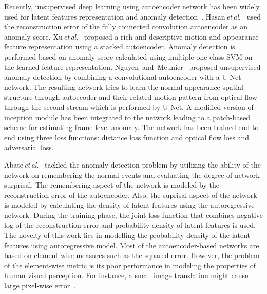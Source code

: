 \documentclass[journal]{IEEEtran}
\newcommand{\authorcite}{{\textit{et}\,\textit{al}.}}
\begin{document}
Recently, unsupervised deep learning using autoencoder network has been widely used for latent features representation and anomaly detection~\cite{xu2015learning,hasan2016learning,Abati_2019_CVPR,nguyen2019anomaly}. Hasan\,\authorcite~\cite{hasan2016learning} used the reconstruction error of the fully connected convolution autoencoder as an anomaly score. Xu\,\authorcite~\cite{xu2015learning} proposed a rich and descriptive motion and appearance feature representation using a stacked autoencoder. Anomaly detection is performed based on anomaly score calculated using multiple one class SVM on the learned feature representation. Nguyen~and~Meunier~\cite{nguyen2019anomaly} proposed unsupervised anomaly detection  by combining a convolutional autoencoder with a U-Net network. The resulting network tries to learn the normal appearance spatial structure through autoecoder and their related motion pattern from optical flow through the second stream which is performed by U-Net. A modified version of inception module has been integrated to the network leading to a patch-based scheme for estimating frame level anomaly. The network has been trained end-to-end using three loss functions: distance loss function and optical flow loss and adversarial loss.

Abate\,\authorcite~\cite{Abati_2019_CVPR} tackled the anomaly detection problem by utilizing the ability of the network on remembering the normal events and evaluating the degree of network surprisal. The remembering aspect of the network is modeled by the reconstruction error of the autoencoder. Also, the suprisal
aspect of the network is modeled by calculating the density of latent features using the autoregressive
network. During the training phase, the joint loss function that combines negative log of the reconstruction error and probability density of latent features is used. The novelty of this work lies in modelling 
the probability density of the latent features using autoregressive model. Most of the autoencoder-based networks are based on element-wise measures such as the squared error. However, the problem of the element-wise metric is its poor performance in modeling the properties of human visual perception. For instance, a small image translation might cause large pixel-wise error~\cite{larsen2015autoencoding}.
\end{document}
